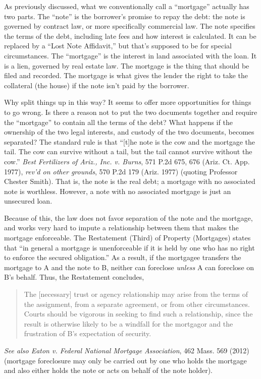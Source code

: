 As previously discussed, what we conventionally call a ``mortgage'' actually has
two parts. The ``note'' is the borrower's promise to repay the debt: the note
is governed by contract law, or more specifically commercial law. The note
specifies the terms of the debt, including late fees and how interest is
calculated. It can be replaced by a ``Lost Note Affidavit,'' but that's
supposed to be for special circumstances. The ``mortgage'' is the interest in
land associated with the loan. It is a lien, governed by real estate law. The
mortgage is the thing that should be filed and recorded. The mortgage is what
gives the lender the right to take the collateral (the house) if the note isn't
paid by the borrower.

Why split things up in this way? It seems to offer more opportunities for
things to go wrong. Is there a reason not to put the two documents together
and require the ``mortgage'' to contain all the terms of the debt? What
happens if the ownership of the two legal interests, and custody of the two
documents, becomes separated? The standard rule is that ``[t]he note is the
cow and the mortgage the tail. The cow can survive without a tail, but the
tail cannot survive without the cow.'' \emph{Best Fertilizers of Ariz., Inc. v.
Burns}, 571 P.2d 675, 676 (Ariz. Ct. App. 1977), \emph{rev'd on other grounds},
570 P.2d 179 (Ariz. 1977) (quoting Professor Chester Smith). That is, the note
is the real debt; a mortgage with no associated note is worthless. However, a
note with no associated mortgage is just an unsecured loan.

Because of this, the law does not favor separation of the note and the mortgage,
and works very hard to impute a relationship between them that makes the
mortgage enforceable. The Restatement (Third) of Property (Mortgages) states
that ``in general a mortgage is unenforceable if it is held by one who has no
right to enforce the secured obligation.'' As a result, if the mortgagee
transfers the mortgage to A and the note to B, neither can foreclose
\textit{unless} A can foreclose on B's behalf. Thus, the Restatement
concludes, 
\begin{quote}
The [necessary] trust or agency relationship may arise from the terms of the
assignment, from a separate agreement, or from other circumstances. Courts
should be vigorous in seeking to find such a relationship, since the result is
otherwise likely to be a windfall for the mortgagor and the frustration of B's
expectation of security. 
\end{quote}
\emph{See also Eaton v. Federal National Mortgage Association}, 462 Mass. 569
(2012) (mortgage foreclosure may only be carried out by one who holds the
mortgage and also either holds the note or acts on behalf of the note holder). 


